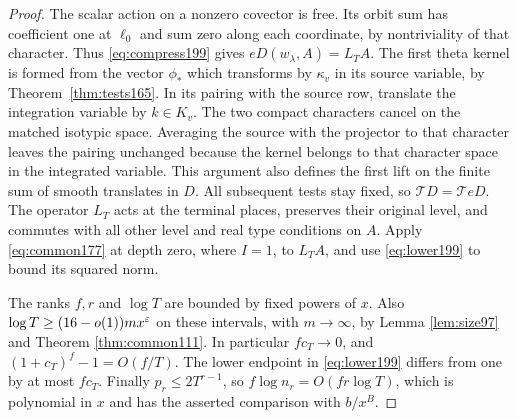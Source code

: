\documentclass[a4paper,11pt]{article}
\theoremstyle{definition}
\theoremstyle{remark}
\numberwithin{equation}{section}
\begin{document}
\begin{proof}
The scalar action on a nonzero covector is free. Its orbit
sum has coefficient one at \(\ell_0\) and sum zero along
each coordinate, by nontriviality of that character.
Thus \eqref{eq:compress199} gives \(eD(w_\lambda,A)=L_TA\).
The first theta kernel is formed from the vector \(\phi_*\)
which transforms by \(\kappa_v\) in its source variable,
by Theorem~\ref{thm:tests165}. In its pairing with the source
row, translate the integration variable by \(k\in K_v\).
The two compact characters cancel on the matched isotypic
space. Averaging the source with the projector to that
character leaves the pairing unchanged because the kernel belongs
to that character space in the integrated variable.
This argument also defines the first lift on the finite sum
of smooth translates in \(D\). All subsequent tests stay fixed,
so \(\mathcal TD=\mathcal T eD\). The operator \(L_T\) acts at
the terminal places, preserves their original level, and commutes
with all other level and real type conditions on \(A\).
Apply \eqref{eq:common177} at depth zero, where \(I=1\), to
\(L_TA\), and use \eqref{eq:lower199} to bound its squared norm.

The ranks \(f,r\) and \(\log T\) are bounded by fixed powers
of \(x\). Also \(\log T\ge(16-o(1))m x^\varepsilon\) on these
intervals, with \(m\to\infty\), by
Lemma \ref{lem:size97} and Theorem \ref{thm:common111}.
In particular \(fc_T\to0\), and \((1+c_T)^f-1=O(f/T)\).
The lower endpoint in \eqref{eq:lower199} differs from one
by at most \(fc_T\). Finally \(p_r\le 2T^{r-1}\), so
\(f\log n_r=O(fr\log T)\), which is polynomial in \(x\)
and has the asserted comparison with \(b/x^B\).
\end{proof}
\end{document}
